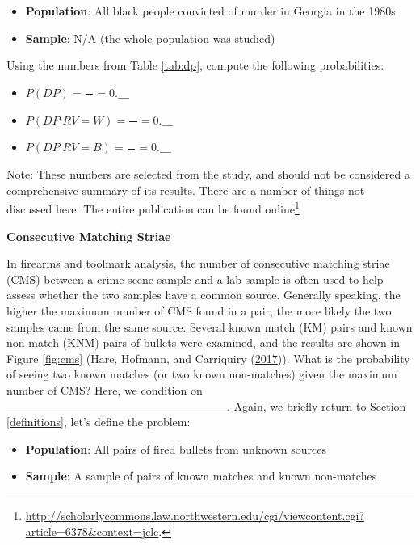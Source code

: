 \documentclass[]{book}
\providecommand{\tightlist}{%
  \setlength{\itemsep}{0pt}\setlength{\parskip}{0pt}}
\let\rmarkdownfootnote\footnote%
\def\footnote{\protect\rmarkdownfootnote}
\theoremstyle{definition}
\theoremstyle{definition}
\theoremstyle{remark}
\begin{document}
\begin{itemize}
\tightlist
\item
  \textbf{Population}: All black people convicted of murder in Georgia
  in the 1980s
\item
  \textbf{Sample}: N/A (the whole population was studied)
\end{itemize}

Using the numbers from Table \ref{tab:dp}, compute the following
probabilities:

\begin{itemize}
\tightlist
\item
  \(P(DP) = \frac{\quad}{\quad} = 0.\_\_\_\) \vspace{.1in}
\item
  \(P(DP | RV = W) = \frac{\quad}{\quad} = 0.\_\_\_\) \vspace{.1in}
\item
  \(P(DP | RV = B) = \frac{\quad}{\quad} = 0.\_\_\_\) \vspace{.1in}
\end{itemize}

Note: These numbers are selected from the study, and should not be
considered a comprehensive summary of its results. There are a number of
things not discussed here. The entire publication can be found
online\footnote{\url{http://scholarlycommons.law.northwestern.edu/cgi/viewcontent.cgi?article=6378\&context=jclc}.}

\textbf{Consecutive Matching Striae}

In firearms and toolmark analysis, the number of consecutive matching
striae (CMS) between a crime scene sample and a lab sample is often used
to help assess whether the two samples have a common source. Generally
speaking, the higher the maximum number of CMS found in a pair, the more
likely the two samples came from the same source. Several known match
(KM) pairs and known non-match (KNM) pairs of bullets were examined, and
the results are shown in Figure \ref{fig:cms} (Hare, Hofmann, and
Carriquiry (\protect\hyperlink{ref-hare}{2017})). What is the
probability of seeing two known matches (or two known non-matches) given
the maximum number of CMS? Here, we condition on
\_\_\_\_\_\_\_\_\_\_\_\_\_\_\_\_\_\_\_\_\_\_\_\_\_\_. Again, we briefly
return to Section \ref{definitions}, let's define the problem:

\begin{itemize}
\tightlist
\item
  \textbf{Population}: All pairs of fired bullets from unknown sources
\item
  \textbf{Sample}: A sample of pairs of known matches and known
  non-matches
\end{itemize}
\end{document}
